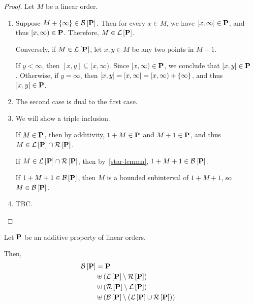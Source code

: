 \begin{proof}
  Let $M$ be a linear order.

  \begin{enumerate}
    \item
          Suppose $M + \left\{ {\infty} \right\} \in \mathcal{B} \left[ {{\mathbf{P}}} \right]$.
          Then for every $x \in M$, we have $[x, \infty] \in \mathbf{P}$,
          and thus $[x, \infty) \in \mathbf{P}$.
          Therefore, $M \in \mathcal{L} \left[ {{\mathbf{P}}} \right]$.

          Conversely, if $M \in \mathcal{L} \left[ {{\mathbf{P}}} \right]$,
          let $x, y \in M$ be any two points in $M + 1$.

          If $y < \infty$, then $[x, y] \subseteq [x, \infty)$.
          Since $[x, \infty) \in \mathbf{P}$, we conclude that $[x, y] \in \mathbf{P}$.
          Otherwise, if $y = \infty$, then $[x, y] = [x, \infty] =
            [x, \infty) + \left\{ {\infty} \right\}$, and thus $[x, y] \in \mathbf{P}$.

    \item
          The second case is dual to the first case.

    \item
          We will show a triple inclusion.

          If $M \in \mathbf{P}$, then by additivity,
          $1 + M \in \mathbf{P}$ and $M + 1 \in \mathbf{P}$,
          and thus $M \in \mathcal{L} \left[ {{\mathbf{P}}} \right] \cap \mathcal{R} \left[ {{\mathbf{P}}} \right]$.

          If $M \in \mathcal{L} \left[ {{\mathbf{P}}} \right] \cap \mathcal{R} \left[ {{\mathbf{P}}} \right]$, then by~\cref{star-lemma},
          $1 + M + 1 \in \mathcal{B} \left[ {{\mathbf{P}}} \right]$.

          If $1 + M + 1 \in \mathcal{B} \left[ {{\mathbf{P}}} \right]$, then $M$ is a bounded
          subinterval of $1 + M + 1$, so $M \in \mathcal{B} \left[ {{\mathbf{P}}} \right]$.

    \item TBC.
  \end{enumerate}
\end{proof}

\begin{lemma}\label{bounded-decomposition}
  Let $\mathbf{P}$ be an additive property of linear orders.

  Then,
  \[
    \begin{aligned}
      \mathcal{B} \left[ {{\mathbf{P}}} \right] & = \mathbf{P}                                                            \\
                    & \uplus \left( {\mathcal{L} \left[ {{\mathbf{P}}} \right] \setminus \mathcal{R} \left[ {{\mathbf{P}}} \right]} \right)                          \\
                    & \uplus \left( {\mathcal{R} \left[ {{\mathbf{P}}} \right] \setminus \mathcal{L} \left[ {{\mathbf{P}}} \right]} \right)                          \\
                    & \uplus \left( { \mathcal{B} \left[ {{\mathbf{P}}} \right] \setminus \left( {\mathcal{L} \left[ {{\mathbf{P}}} \right] \cup \mathcal{R} \left[ {{\mathbf{P}}} \right]} \right)} \right)
    \end{aligned}
  \]
\end{lemma}

